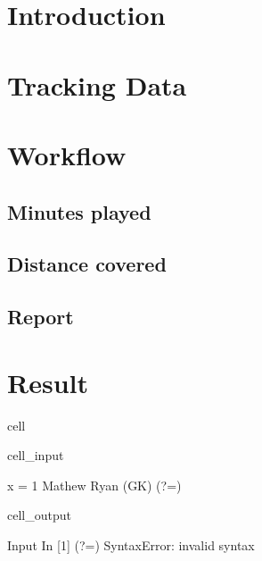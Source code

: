 \documentclass[letterpaper,10pt,english]{jupyterBook}
\begin{document}
\section{Introduction}
\label{\detokenize{Chap2/chap2:introduction}}

\section{Tracking Data}
\label{\detokenize{Chap2/chap2:tracking-data}}

\section{Workflow}
\label{\detokenize{Chap2/chap2:workflow}}

\subsection{Minutes played}
\label{\detokenize{Chap2/chap2:minutes-played}}

\subsection{Distance covered}
\label{\detokenize{Chap2/chap2:distance-covered}}

\subsection{Report}
\label{\detokenize{Chap2/chap2:report}}

\section{Result}
\label{\detokenize{Chap2/chap2:result}}
\begin{sphinxuseclass}{cell}\begin{sphinxVerbatimInput}

\begin{sphinxuseclass}{cell_input}
\begin{sphinxVerbatim}[commandchars=\\\{\}]
x = \PYGZdq{}1 Mathew Ryan (GK)\PYGZdq{}
(?=\PYGZus{})
\end{sphinxVerbatim}

\end{sphinxuseclass}\end{sphinxVerbatimInput}
\begin{sphinxVerbatimOutput}

\begin{sphinxuseclass}{cell_output}
\begin{sphinxVerbatim}[commandchars=\\\{\}]
  Input In [1]
    (?=\PYGZus{})
     \PYGZca{}
SyntaxError: invalid syntax
\end{sphinxVerbatim}

\end{sphinxuseclass}\end{sphinxVerbatimOutput}

\end{sphinxuseclass}
\end{document}
